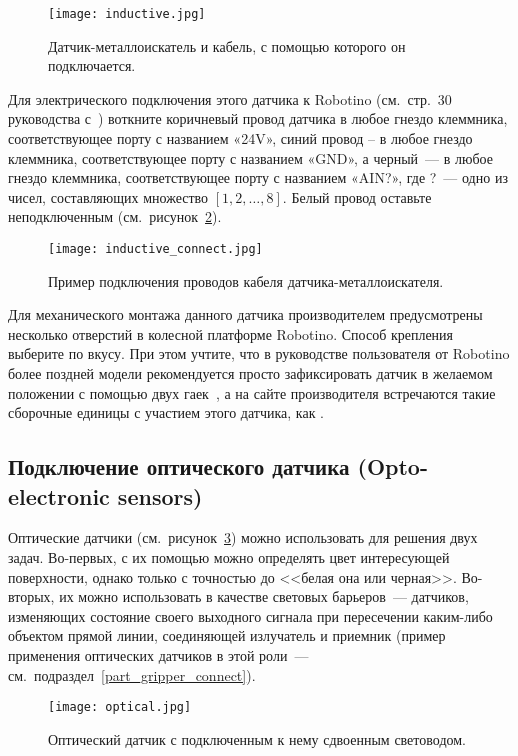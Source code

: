 \begin{figure}[h!]
	\centering
	\texttt{[image: inductive.jpg]}
	\caption{Датчик-металлоискатель и кабель, с помощью которого он подключается.}
	\label{img_inductive}
\end{figure}

Для электрического подключения этого датчика к Robotino (см.~стр.~30 руководства с~\cite{news_manual}) воткните коричневый провод датчика в любое гнездо клеммника, соответствующее порту с названием «24V», синий провод – в любое гнездо клеммника, соответствующее порту с названием «GND», а черный~--- в любое гнездо клеммника, соответствующее порту с названием «AIN?», где ?~--- одно из чисел, составляющих множество $[1, 2, \ldots, 8]$.
Белый провод оставьте неподключенным (см.~рисунок~\ref{img_inductive_connect}).

\begin{figure}[h!]
	\centering
	\texttt{[image: inductive\_connect.jpg]}
	\caption{Пример подключения проводов кабеля датчика-металлоискателя.}
	\label{img_inductive_connect}
\end{figure}

Для механического монтажа данного датчика производителем предусмотрены несколько отверстий в колесной платформе Robotino.
Способ крепления выберите по вкусу.
При этом учтите, что в руководстве пользователя от Robotino более поздней модели рекомендуется просто зафиксировать датчик в желаемом положении с помощью двух гаек~\cite{news_manual}, а на сайте производителя встречаются такие сборочные единицы с участием этого датчика, как \cite{strange1, strange2}.



\subsection{Подключение оптического датчика (Opto-electronic sensors)}
Оптические датчики (см.~рисунок~\ref{img_optical}) можно использовать для решения двух задач.
Во-первых, с их помощью можно определять цвет интересующей поверхности, однако только с точностью до <<белая она или черная>>.
Во-вторых, их можно использовать в качестве световых барьеров~--- датчиков, изменяющих состояние своего выходного сигнала при пересечении каким-либо объектом прямой линии, соединяющей излучатель и приемник (пример применения оптических датчиков в этой роли~--- см.~подраздел~\ref{part_gripper_connect}).

\begin{figure}[h!]
	\centering
	\texttt{[image: optical.jpg]}
	\caption{Оптический датчик с подключенным к нему сдвоенным световодом.}
	\label{img_optical}
\end{figure}


